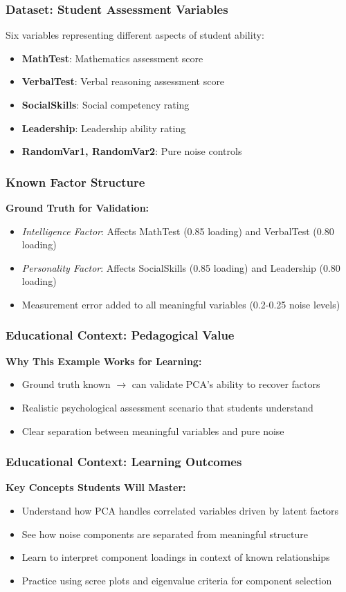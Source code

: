 \documentclass[aspectratio=169]{beamer}
\begin{document}
\begin{frame}
    \frametitle{Dataset: Student Assessment Variables}
    Six variables representing different aspects of student ability:
    \begin{itemize}
        \item \textbf{MathTest}: Mathematics assessment score \pause
        \item \textbf{VerbalTest}: Verbal reasoning assessment score \pause
        \item \textbf{SocialSkills}: Social competency rating \pause
        \item \textbf{Leadership}: Leadership ability rating \pause
        \item \textbf{RandomVar1, RandomVar2}: Pure noise controls \pause
    \end{itemize}
\end{frame}

\begin{frame}
    \frametitle{Known Factor Structure}
    \textbf{Ground Truth for Validation:}
    \begin{itemize}
        \item \textit{Intelligence Factor}: Affects MathTest (0.85 loading) and VerbalTest (0.80 loading) \pause
        \item \textit{Personality Factor}: Affects SocialSkills (0.85 loading) and Leadership (0.80 loading) \pause
        \item Measurement error added to all meaningful variables (0.2-0.25 noise levels) \pause
    \end{itemize}
\end{frame}

\begin{frame}
    \frametitle{Educational Context: Pedagogical Value}
    \textbf{Why This Example Works for Learning:}
    \begin{itemize}
        \item Ground truth known $\rightarrow$ can validate PCA's ability to recover factors \pause
        \item Realistic psychological assessment scenario that students understand \pause
        \item Clear separation between meaningful variables and pure noise \pause
    \end{itemize}
\end{frame}

\begin{frame}
    \frametitle{Educational Context: Learning Outcomes}
    \textbf{Key Concepts Students Will Master:}
    \begin{itemize}
        \item Understand how PCA handles correlated variables driven by latent factors \pause
        \item See how noise components are separated from meaningful structure \pause
        \item Learn to interpret component loadings in context of known relationships \pause
        \item Practice using scree plots and eigenvalue criteria for component selection \pause
    \end{itemize}
\end{frame}
\end{document}
